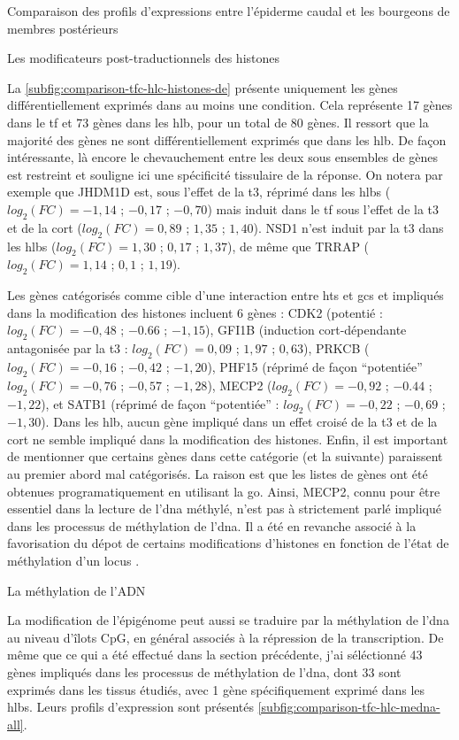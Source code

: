\documentclass[../main.tex]{subfiles}
\begin{document}
\begin{chapter}{Comparaison des profils d'expressions entre l'épiderme caudal et les bourgeons de membres postérieurs}
\begin{section}{Les modificateurs post-traductionnels des histones}


La \autoref{subfig:comparison-tfc-hlc-histones-de} présente uniquement les gènes différentiellement exprimés dans au moins une condition.
Cela représente 17 gènes dans le \gls{tf} et 73 gènes dans les \gls{hlb}, pour un total de 80 gènes.
Il ressort que la majorité des gènes ne sont différentiellement exprimés que dans les \gls{hlb}.
De façon intéressante, là encore le chevauchement entre les deux sous ensembles de gènes est restreint et souligne ici une spécificité tissulaire de la réponse.
On notera par exemple que JHDM1D est, sous l'effet de la \gls{t3}, réprimé dans les \glspl{hlb} ($log_2(FC)=-1,14$ ; $-0,17$ ; $-0,70$) mais induit dans le \gls{tf} sous l'effet de la \gls{t3} et de la \gls{cort} ($log_2(FC)=0,89$ ; $1,35$ ; $1,40$).
NSD1 n'est induit par la \gls{t3} dans les \glspl{hlb} ($log_2(FC)=1,30$ ; $0,17$ ; $1,37$), de même que TRRAP ($log_2(FC)=1,14$ ; $0,1$ ; $1,19$).
\par
Les gènes catégorisés comme cible d'une interaction entre \glspl{ht} et \glspl{gc} et impliqués dans la modification des histones incluent 6 gènes :
CDK2 (potentié : $log_2(FC)=-0,48$ ; $-0.66$ ; $-1,15$), GFI1B (induction \gls{cort}-dépendante antagonisée par la \gls{t3} : $log_2(FC)=0,09$ ; $1,97$ ; $0,63$), PRKCB ($log_2(FC)=-0,16$ ; $-0,42$ ; $-1,20$), PHF15 (réprimé de façon ``potentiée'' $log_2(FC)=-0,76$ ; $-0,57$ ; $-1,28$), MECP2 ($log_2(FC)=-0,92$ ; $-0.44$ ; $-1,22$),  et SATB1 (réprimé de façon ``potentiée'' : $log_2(FC)=-0,22$ ; $-0,69$ ; $-1,30$).
Dans les \gls{hlb}, aucun gène impliqué dans un effet croisé de la \gls{t3} et de la \gls{cort} ne semble impliqué dans la modification des histones.
Enfin, il est important de mentionner que certains gènes dans cette catégorie (et la suivante) paraissent au premier abord mal catégorisés.
La raison est que les listes de gènes ont été obtenues programatiquement en utilisant la \gls{go}.
Ainsi, MECP2, connu pour être essentiel dans la lecture de l'\gls{dna} méthylé, n'est pas à strictement parlé impliqué dans les processus de méthylation de l'\gls{dna}.
Il a été en revanche associé à la favorisation du dépot de certains modifications d'histones en fonction de l'état de méthylation d'un locus \citep{Fuks2003}.

\end{section}


\begin{section}{La méthylation de l'ADN}

La modification de l'épigénome peut aussi se traduire par la méthylation de l'\gls{dna} au niveau d'îlots CpG, en général associés à la répression de la transcription.
De même que ce qui a été effectué dans la section précédente, j'ai séléctionné 43 gènes impliqués dans les processus de méthylation de l'\gls{dna}, dont 33 sont exprimés dans les tissus étudiés, avec 1 gène spécifiquement exprimé dans les \glspl{hlb}.
Leurs profils d'expression sont présentés \autoref{subfig:comparison-tfc-hlc-medna-all}.


\end{section}
\end{chapter}
\end{document}
